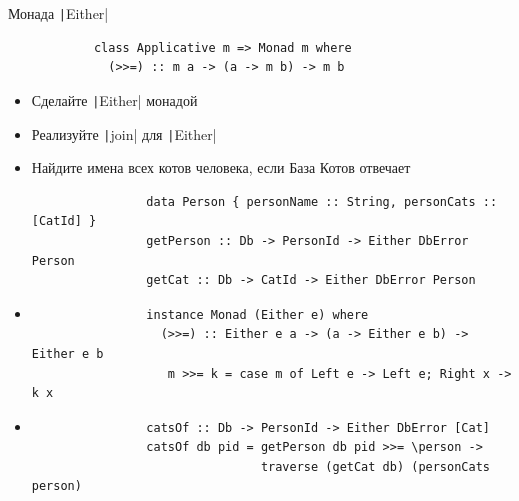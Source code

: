     \begin{frame}[fragile]{Монада \texttt|Either|}
        \begin{verbatim}
            class Applicative m => Monad m where
              (>>=) :: m a -> (a -> m b) -> m b
        \end{verbatim}
        \begin{itemize}
            \item[\todo] Сделайте \texttt|Either| монадой
            \item[\todo] Реализуйте \texttt|join| для \texttt|Either|
            \item[\todo] Найдите имена всех котов человека, если База Котов отвечает
            \begin{verbatim}
                data Person { personName :: String, personCats :: [CatId] }
                getPerson :: Db -> PersonId -> Either DbError Person
                getCat :: Db -> CatId -> Either DbError Person
            \end{verbatim}
            \item[\answer] \pause
            \begin{verbatim}
                instance Monad (Either e) where
                  (>>=) :: Either e a -> (a -> Either e b) -> Either e b
                   m >>= k = case m of Left e -> Left e; Right x -> k x
            \end{verbatim}
            \item[\answer] \pause
            \begin{verbatim}
                catsOf :: Db -> PersonId -> Either DbError [Cat]
                catsOf db pid = getPerson db pid >>= \person ->
                                traverse (getCat db) (personCats person)
            \end{verbatim}
        \end{itemize}
    \end{frame}

